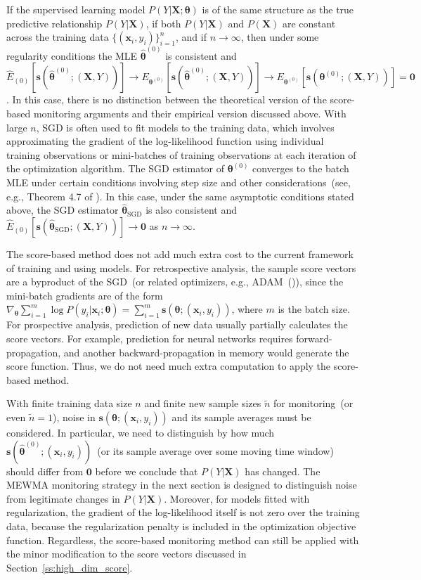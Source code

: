 \documentclass[twoside,11pt]{article}
\begin{document}
If the supervised learning model $P(Y|\bm{X};\bm{\theta})$ is of the same structure as the true predictive relationship $P(Y|\bm{X})$, if both $P(Y|\bm{X})$ and $P(\bm{X})$ are constant across the training data $\{(\bm{x}_i, y_i)\}_{i=1}^n$, and if $n \to \infty$, then under some regularity conditions the MLE $\hat{\bm { \theta}} ^{ (0)}$ is consistent and  $\hat{E}_{(0)} [\bm{s}(\hat{\bm { \theta}} ^{ (0)};(\bm {X}, Y))] \to E_{\bm { \theta} ^{ (0)}}[\bm{s}(\hat{\bm { \theta}} ^{ (0)};(\bm {X}, Y))] \to E_{\bm { \theta} ^{ (0)}}[\bm{s}(\bm { \theta} ^{ (0)};(\bm {X}, Y))] = \bm {0}$. In this case, there is no distinction between the theoretical version of the score-based monitoring arguments and their empirical version discussed above. With large $n$, SGD is often used to fit models to the training data, which involves approximating the gradient of the log-likelihood function using individual training observations or mini-batches of training observations at each iteration of the optimization algorithm. The SGD estimator of $\bm { \theta} ^{ (0)}$ converges to the batch MLE under certain conditions involving step size and other considerations~(see, e.g., Theorem 4.7 of \cite{bottou2018optimization}). In this case, under the same asymptotic conditions stated above, the SGD estimator $\hat {\bm { \theta}}_{\mathrm{SGD}}$ is also consistent and $\hat{E}_{(0)} [\bm{s}(\hat{\bm { \theta}}_{\mathrm{SGD}};(\bm {X}, Y))] \to \bm{0}$ as $n \to \infty$. 

The score-based method does not add much extra cost to the current framework of training and using models. For retrospective analysis, the sample score vectors are a byproduct of the SGD~(or related optimizers, e.g., ADAM~(\cite{kingma2014adam})), since the mini-batch gradients are of the form $\nabla _{\bm { \theta}} \sum _{i=1} ^{m} \log{P(y_i|\bm {x}_i;\bm{\theta})} = \sum _{i=1} ^{m} \bm{s}(\bm { \theta};(\bm {x}_i, y_i))$, where $m$ is the batch size. For prospective analysis, prediction of new data usually partially calculates the score vectors. For example, prediction for neural networks requires forward-propagation, and another backward-propagation in memory would generate the score function. Thus, we do not need much extra computation to apply the score-based method.

With finite training data size $n$ and finite new sample sizes $\tilde{n}$ for monitoring~(or even $\tilde{n}=1$), noise in $\bm{s}(\bm { \theta};(\bm {x}_i, y_i))$ and its sample averages must be considered. In particular, we need to distinguish by how much $\bm{s}(\hat{\bm { \theta}}^{(0)};(\bm {x}_i, y_i))$~(or its sample average over some moving time window) should differ from $\bm{0}$ before we conclude that $P(Y|\bm{X})$ has changed. The MEWMA monitoring strategy in the next section is designed to distinguish noise from legitimate changes in $P(Y|\bm{X})$. Moreover, for models fitted with regularization, the gradient of the log-likelihood itself is not zero over the training data, because the regularization penalty is included in the optimization objective function. Regardless, the score-based monitoring method can still be applied with the minor modification to the score vectors discussed in Section~\ref{ss:high_dim_score}.
\end{document}
